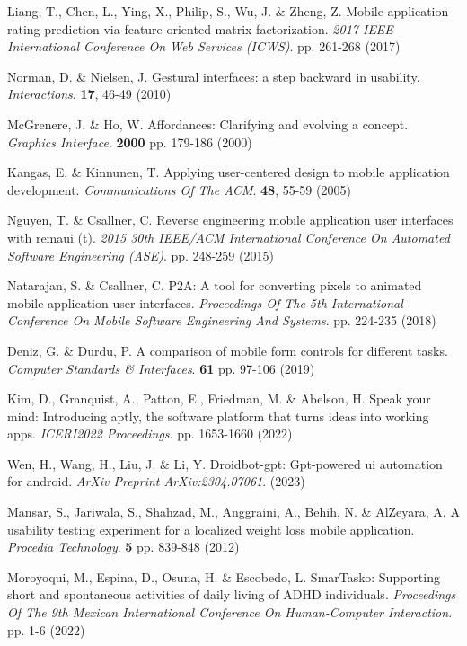 \documentclass[preprint,12pt]{elsarticle}
\begin{document}
\begin{thebibliography}{99}
Liang, T., Chen, L., Ying, X., Philip, S., Wu, J. \& Zheng, Z. Mobile application rating prediction via feature-oriented matrix factorization. {\em 2017 IEEE International Conference On Web Services (ICWS)}. pp. 261-268 (2017)

Norman, D. \& Nielsen, J. Gestural interfaces: a step backward in usability. {\em Interactions}. \textbf{17}, 46-49 (2010)

McGrenere, J. \& Ho, W. Affordances: Clarifying and evolving a concept. {\em Graphics Interface}. \textbf{2000} pp. 179-186 (2000)

Kangas, E. \& Kinnunen, T. Applying user-centered design to mobile application development. {\em Communications Of The ACM}. \textbf{48}, 55-59 (2005)

Nguyen, T. \& Csallner, C. Reverse engineering mobile application user interfaces with remaui (t). {\em 2015 30th IEEE/ACM International Conference On Automated Software Engineering (ASE)}. pp. 248-259 (2015)

Natarajan, S. \& Csallner, C. P2A: A tool for converting pixels to animated mobile application user interfaces. {\em Proceedings Of The 5th International Conference On Mobile Software Engineering And Systems}. pp. 224-235 (2018)

Deniz, G. \& Durdu, P. A comparison of mobile form controls for different tasks. {\em Computer Standards \& Interfaces}. \textbf{61} pp. 97-106 (2019)

Kim, D., Granquist, A., Patton, E., Friedman, M. \& Abelson, H. Speak your mind: Introducing aptly, the software platform that turns ideas into working apps. {\em ICERI2022 Proceedings}. pp. 1653-1660 (2022)

Wen, H., Wang, H., Liu, J. \& Li, Y. Droidbot-gpt: Gpt-powered ui automation for android. {\em ArXiv Preprint ArXiv:2304.07061}. (2023)

Mansar, S., Jariwala, S., Shahzad, M., Anggraini, A., Behih, N. \& AlZeyara, A. A usability testing experiment for a localized weight loss mobile application. {\em Procedia Technology}. \textbf{5} pp. 839-848 (2012)

Moroyoqui, M., Espina, D., Osuna, H. \& Escobedo, L. SmarTasko: Supporting short and spontaneous activities of daily living of ADHD individuals. {\em Proceedings Of The 9th Mexican International Conference On Human-Computer Interaction}. pp. 1-6 (2022)


\end{thebibliography}
\end{document}
